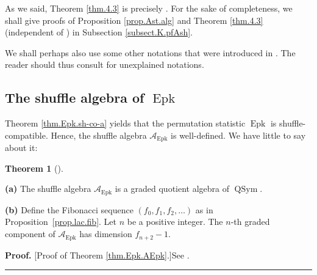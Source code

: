 \documentclass[numbers=enddot,12pt,final,onecolumn,notitlepage]{scrartcl}%
\theoremstyle{definition}
\newtheorem{theo}{Theorem}[section]
\newenvironment{theorem}[1][]
{\begin{theo}[#1]\begin{leftbar}}
{\end{leftbar}\end{theo}}
\newenvironment{proof}[1][Proof]{\noindent\textbf{#1.} }{\ \rule{0.5em}{0.5em}}
\newenvironment{verlong}{}{}
\newenvironment{vershort}{}{}
\newenvironment{noncompile}{}{}
\begin{document}
\begin{verlong}
As we said, Theorem \ref{thm.4.3} is precisely \cite[Theorem 4.3]{part1}.
For the sake of completeness, we shall give proofs of Proposition
\ref{prop.Ast.alg} and Theorem \ref{thm.4.3} (independent of \cite{part1}) in
Subsection \ref{subsect.K.pfAsh}.
\end{verlong}

\begin{noncompile}
We shall perhaps also use some other notations that were introduced in
\cite{part1}. The reader should thus consult \cite{part1} for unexplained notations.
\end{noncompile}

\subsection{The shuffle algebra of $\operatorname*{Epk}$}

Theorem \ref{thm.Epk.sh-co-a} yields that the permutation statistic
$\operatorname*{Epk}$ is shuffle-compatible. Hence, the shuffle algebra
$\mathcal{A}_{\operatorname*{Epk}}$ is well-defined. We have little to say
about it:

\begin{theorem}
\label{thm.Epk.AEpk}\textbf{(a)} The shuffle algebra $\mathcal{A}%
_{\operatorname*{Epk}}$ is a graded quotient algebra of $\operatorname*{QSym}$.

\textbf{(b)} Define the Fibonacci sequence
$\left(  f_{0},f_{1},f_{2},\ldots\right)  $ as in
Proposition~\ref{prop.lac.fib}.
Let $n$ be a positive integer. The $n$-th graded component of
$\mathcal{A}_{\operatorname*{Epk}}$ has dimension $f_{n+2}-1$.
\end{theorem}

\begin{vershort}
\begin{proof}
[Proof of Theorem \ref{thm.Epk.AEpk}.]See \cite{verlong}.
\end{proof}
\end{vershort}
\end{document}
